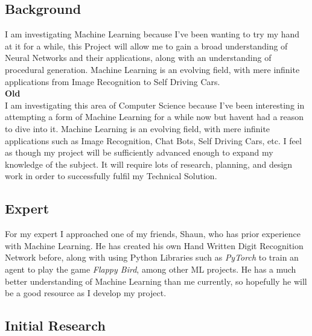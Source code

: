 \begin{flushleft}
        \subsection{Background}
            \vspace{0.2cm}
            I am investigating Machine Learning because I've been wanting to try my hand at it for a while, this Project
            will allow me to gain a broad understanding of Neural Networks and their applications, along with an understanding
            of procedural generation. Machine Learning is an evolving field, with mere infinite applications from Image Recognition
            to Self Driving Cars. \\
            \vspace{0.2cm}
            \textbf{Old} \\ 
            I am investigating this area of Computer Science because I've been interesting in attempting a form of
            Machine Learning for a while now but havent had a reason to dive into it. Machine Learning is an evolving
            field, with mere infinite applications such as Image Recognition, Chat Bots, Self Driving Cars, 
            etc. I feel as though my project will be sufficiently advanced enough to expand my knowledge of the subject.
            It will require lots of research, planning, and design work in order to successfully fulfil my Technical
            Solution. \\

            \vspace{0.2cm}
        \subsection{Expert}
            \vspace{0.2cm}
            For my expert I approached one of my friends, Shaun, who has prior experience with Machine Learning. He has
            created his own Hand Written Digit Recognition Network before, along with using Python Libraries such as 
            \textit{PyTorch} to train an agent to play the game \textit{Flappy Bird}, among other ML projects. He has 
            a much better understanding of Machine Learning than me currently, so hopefully he will be a good resource 
            as I develop my project. \\

            \vspace{0.2cm}        
        \subsection{Initial Research}

\end{flushleft}
